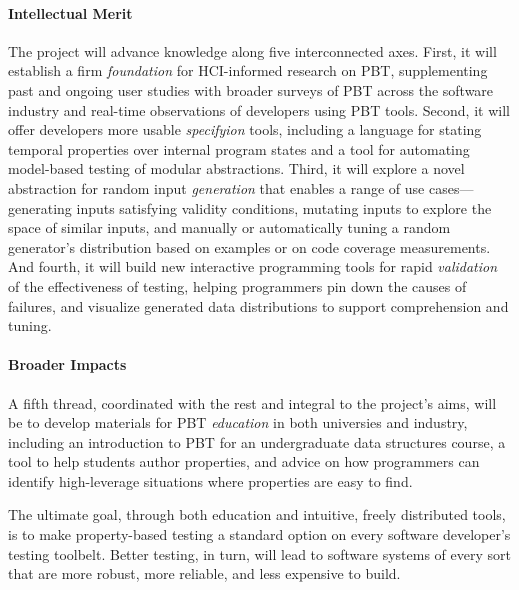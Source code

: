 \paragraph*{Intellectual Merit}
The project will advance knowledge along five interconnected axes.
%
First, it will establish a firm {\em foundation} for HCI-informed
research on PBT, supplementing past and ongoing user studies with
broader surveys of PBT across the software industry and real-time
observations of developers using PBT tools.
%
Second, it will offer developers more usable \emph{specifyion} tools,
including a language for stating temporal properties over internal
program states and a tool for automating model-based testing of
modular abstractions.
%
Third, it will explore a novel abstraction for random input {\em
  generation} that enables a range of use cases---generating inputs
satisfying validity conditions, mutating inputs to explore the space
of similar inputs, and manually or automatically tuning a random
generator's distribution based on examples or on code coverage
measurements.
%
And fourth, it will build new interactive programming tools for rapid
\emph{validation} of the effectiveness of testing, helping programmers
pin down the causes of failures, and visualize generated data
distributions to support comprehension and tuning.


\paragraph*{Broader Impacts}
A fifth thread, coordinated with the rest and integral to the
project's aims, will be to develop materials for PBT {\em education}
in both universies and industry, including an introduction to PBT for
an undergraduate data structures course, a tool to help students
author properties, and advice on how programmers can identify
high-leverage situations where properties are easy to find.

The ultimate goal, through both education and intuitive, freely
distributed tools, is to make property-based testing a standard option
on every software developer's testing toolbelt.  Better testing, in
turn, will lead to software systems of every sort that are more
robust, more reliable, and less expensive to build.


